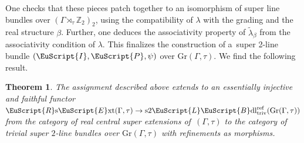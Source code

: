 \documentclass[pdftex]{sigma}
\numberwithin{equation}{section}
\newtheorem{Theorem}{Theorem}[section]
\def\mathscr#1{\EuScript{#1}}
\def\Z {\mathbb{Z}}
\newcommand{\LineBdl}{\mathscr{L}\mathscr{B}\mathrm{dl}}
\newcommand{\stwoLineBdltriv}{\mathrm{s}2\LineBdl_{\mathrm{triv}}}
\def\RsExt{\normalfont\mathscr{R}\text{s}\mathscr{E}\text{xt}}
\def\Gr{\mathrm{Gr}}
\begin{document}
One checks that these pieces patch together to an isomorphism of super line bundles over ${(\Gamma \rtimes_{\tau} \Z_2)_2}$, using the compatibility of $\lambda$ with the grading and the real structure $\beta$.
Further, one deduces the associativity property of $\tilde{\lambda}_{\beta}$ from the associativity condition of $\lambda$. This finalizes the construction of a~super 2-line bundle $(\mathscr{I},\mathscr{P},\psi)$ over $\Gr(\Gamma,\tau)$. We find the following result.
\begin{Theorem}
\label{Lemma: Real central extensions are super 2-line bundles}
\label{Proposition: Moutou real extensions embed into trivial super 2-line bundles}
 The assignment described above extends to an essentially injective and faithful functor
$
 \RsExt(\Gamma,\tau) \to \stwoLineBdltriv^{\mathrm{ref}}(\Gr(\Gamma,\tau))
$
 from the category of real central super extensions of~$(\Gamma,\tau)$ to the category of trivial super $2$-line bundles over
 $\Gr(\Gamma,\tau)$ with refinements as morphisms.
\end{Theorem}
\end{document}
